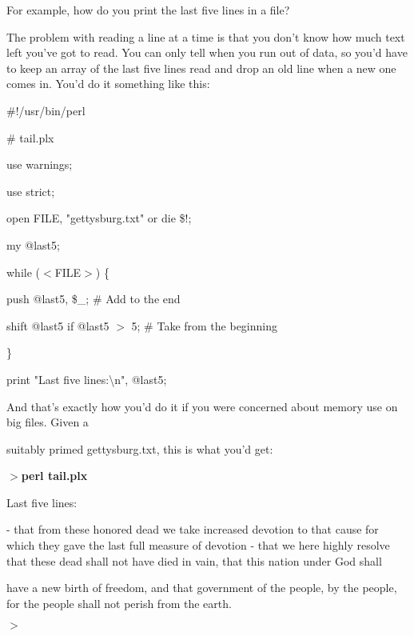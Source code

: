 \documentclass[a4paper,11pt]{book}
\begin{document}
\noindent For example, how do you print the last five lines in a file?

\noindent 

\noindent The problem with reading a line at a time is that you don't know how much text left you've got to read. You can only tell when you run out of data, so you'd have to keep an array of the last five lines read and drop an old line when a new one comes in. You'd do it something like this:

\noindent 

\noindent \#!/usr/bin/perl

\noindent \# tail.plx

\noindent use warnings;

\noindent use strict;

\noindent 

\noindent open FILE, "gettysburg.txt" or die \$!;

\noindent my @last5;

\noindent 

\noindent while ($<$FILE$>$) \{

\noindent push @last5, \$\_; \# Add to the end

\noindent shift @last5 if @last5 $>$ 5; \# Take from the beginning

\noindent \}

\noindent 

\noindent print "Last five lines:\textbackslash n", @last5;

\noindent 

\noindent 

\noindent And that's exactly how you'd do it if you were concerned about memory use on big files. Given a

\noindent suitably primed gettysburg.txt, this is what you'd get:

\noindent 

\noindent $>$\textbf{perl tail.plx}

\noindent Last five lines:

\noindent - that from these honored dead we take increased devotion to that cause for which they gave the last full measure of devotion - that we here highly resolve that these dead shall not have died in vain, that this nation under God shall

\noindent have a new birth of freedom, and that government of the people, by the people, for the people shall not perish from the earth.

\noindent $>$
\end{document}
